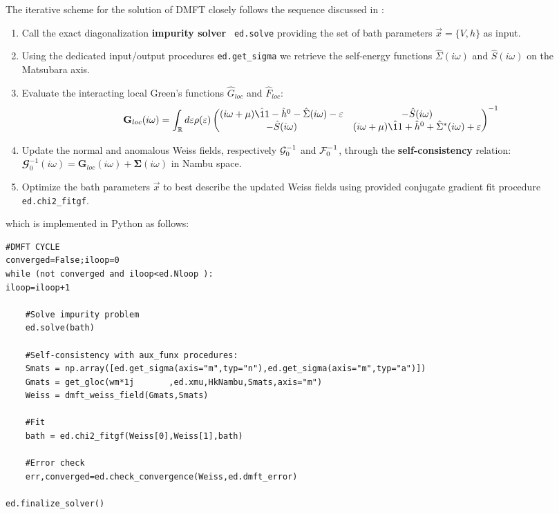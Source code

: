 The iterative scheme for the solution of DMFT closely follows the
sequence discussed in :   
\begin{enumerate}
\item Call the exact diagonalization {\bf impurity solver} {\tt
    ed.solve} providing the set of bath parameters $\vec{x}=\{V,h\}$  as input. 
\item Using the dedicated
  input/output procedures {\tt ed.get\_sigma} we retrieve the self-energy functions  
  $\hat{\Sigma}(i\omega)$ and $\hat{S}(i\omega)$ on the 
  Matsubara axis.
\item
  Evaluate the interacting local Green's functions $\hat{G}_{loc}$ and
  $\hat{F}_{loc}$:
  \begin{equation}
  {\mathbf G}_{loc}(i\omega) =
  \int_\RRR d\e \rho(\e)
  \begin{pmatrix}
    (i\omega +\mu)\hat{\11} - \hat{h}^0 - \hat{\Sigma}(i\omega) -\e & -\hat{S}(i\omega) \\
    -\hat{S}(i\omega) & (i\omega +\mu)\hat{\11} + \hat{h}^0 +
    \hat{\Sigma}^*(i\omega) +\e\\
  \end{pmatrix}^{-1}
\end{equation}
\item Update the normal and anomalous Weiss fields, respectively 
  ${\cal G}_0^{-1}$ and ${\cal F}_0^{-1}$, through the {\bf self-con\-sis\-ten\-cy}
    relation: $\mathbfcal{G}^{-1}_0(i\omega) = {\mathbf G}_{loc}(i\omega) +
    {\mathbf \Sigma}(i\omega)$ in Nambu space. 
  \item Optimize the bath parameters $\vec{x}$ to best describe the  updated
    Weiss fields using \NAME provided conjugate gradient  fit
    procedure {\tt ed.chi2\_fitgf}.
\end{enumerate}
which is implemented in Python as follows:
\begin{lstlisting}[style=mypython,numbers=none,basicstyle={\scriptsize\ttfamily}]
#DMFT CYCLE
converged=False;iloop=0
while (not converged and iloop<ed.Nloop ):
iloop=iloop+1

    #Solve impurity problem
    ed.solve(bath)
    
    #Self-consistency with aux_funx procedures:
    Smats = np.array([ed.get_sigma(axis="m",typ="n"),ed.get_sigma(axis="m",typ="a")])    
    Gmats = get_gloc(wm*1j       ,ed.xmu,HkNambu,Smats,axis="m") 
    Weiss = dmft_weiss_field(Gmats,Smats)                  
          
    #Fit
    bath = ed.chi2_fitgf(Weiss[0],Weiss[1],bath)

    #Error check
    err,converged=ed.check_convergence(Weiss,ed.dmft_error)

ed.finalize_solver()
\end{lstlisting}


